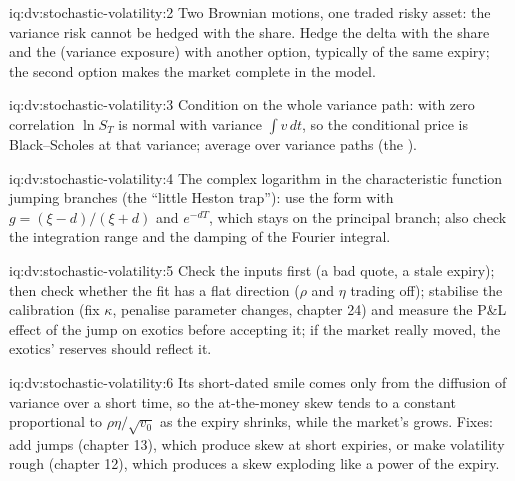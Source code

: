 \begin{solution}{iq:dv:stochastic-volatility:2}
Two Brownian motions, one traded risky asset: the variance risk cannot be hedged with the share. Hedge the delta with
the share and the  (variance exposure) with another option, typically of the same expiry; the second option makes
the market complete in the model.
\end{solution}

\begin{solution}{iq:dv:stochastic-volatility:3}
Condition on the whole variance path: with zero correlation $\ln S_T$ is normal with variance $\int v\,dt$, so the
conditional price is Black--Scholes at that variance; average over variance paths (the ).
\end{solution}

\begin{solution}{iq:dv:stochastic-volatility:4}
The complex logarithm in the characteristic function jumping branches (the ``little Heston trap''): use the form with
$g=(\xi-d)/(\xi+d)$ and $e^{-dT}$, which stays on the principal branch; also check the integration range and the
damping of the Fourier integral.
\end{solution}

\begin{solution}{iq:dv:stochastic-volatility:5}
Check the inputs first (a bad quote, a stale expiry); then check whether the fit has a flat direction ($\rho$ and $\eta$
trading off); stabilise the calibration (fix $\kappa$, penalise parameter changes, chapter 24) and measure the P\&L effect
of the jump on exotics before accepting it; if the market really moved, the exotics' reserves should reflect it.
\end{solution}

\begin{solution}{iq:dv:stochastic-volatility:6}
Its short-dated smile comes only from the diffusion of variance over a short time, so the at-the-money skew tends to a
constant proportional to $\rho\eta/\sqrt{v_0}$ as the expiry shrinks, while the market's grows. Fixes: add jumps
(chapter 13), which produce skew at short expiries, or make volatility rough (chapter 12), which produces a skew
exploding like a power of the expiry.
\end{solution}
